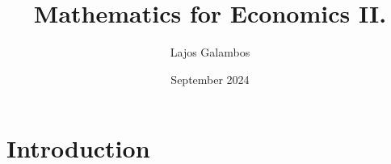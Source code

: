 \documentclass{article}
\title{Mathematics for Economics II.}
\author{Lajos Galambos}
\date{September 2024}
\begin{document}
\maketitle

\section{Introduction}
\end{document}
